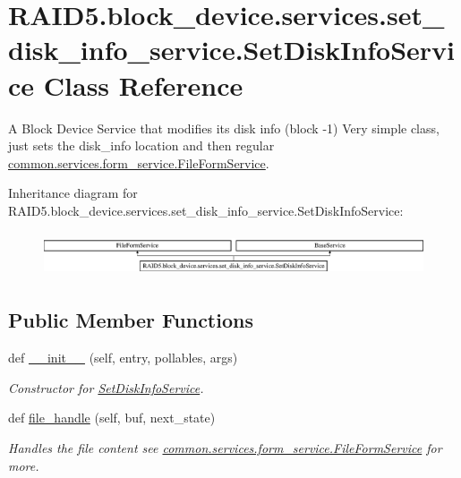 \hypertarget{class_r_a_i_d5_1_1block__device_1_1services_1_1set__disk__info__service_1_1_set_disk_info_service}{}\section{R\+A\+I\+D5.\+block\+\_\+device.\+services.\+set\+\_\+disk\+\_\+info\+\_\+service.\+Set\+Disk\+Info\+Service Class Reference}
\label{class_r_a_i_d5_1_1block__device_1_1services_1_1set__disk__info__service_1_1_set_disk_info_service}


A Block Device Service that modifies it\textquotesingle{}s disk info (block -\/1) Very simple class, just sets the disk\+\_\+info location and then regular \hyperlink{class_r_a_i_d5_1_1common_1_1services_1_1form__service_1_1_file_form_service}{common.\+services.\+form\+\_\+service.\+File\+Form\+Service}.  


Inheritance diagram for R\+A\+I\+D5.\+block\+\_\+device.\+services.\+set\+\_\+disk\+\_\+info\+\_\+service.\+Set\+Disk\+Info\+Service\+:\begin{figure}[H]
\begin{center}
\leavevmode
\includegraphics[height=1.320755cm]{class_r_a_i_d5_1_1block__device_1_1services_1_1set__disk__info__service_1_1_set_disk_info_service}
\end{center}
\end{figure}
\subsection*{Public Member Functions}
\begin{DoxyCompactItemize}
\item 
def \hyperlink{class_r_a_i_d5_1_1block__device_1_1services_1_1set__disk__info__service_1_1_set_disk_info_service_a475d7ba1551735748b5a226e0113fbd7}{\+\_\+\+\_\+init\+\_\+\+\_\+} (self, entry, pollables, args)
\begin{DoxyCompactList}\small\item\em Constructor for \hyperlink{class_r_a_i_d5_1_1block__device_1_1services_1_1set__disk__info__service_1_1_set_disk_info_service}{Set\+Disk\+Info\+Service}. \end{DoxyCompactList}\item 
def \hyperlink{class_r_a_i_d5_1_1block__device_1_1services_1_1set__disk__info__service_1_1_set_disk_info_service_a800282607bae5d6545a1eb4e586ef02c}{file\+\_\+handle} (self, buf, next\+\_\+state)
\begin{DoxyCompactList}\small\item\em Handles the file content see \hyperlink{class_r_a_i_d5_1_1common_1_1services_1_1form__service_1_1_file_form_service}{common.\+services.\+form\+\_\+service.\+File\+Form\+Service} for more. \end{DoxyCompactList}\end{DoxyCompactItemize}
